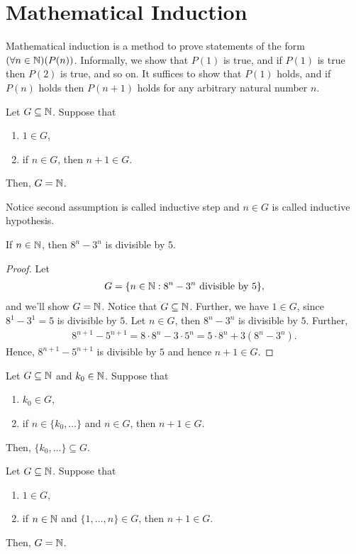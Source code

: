 \documentclass[a4paper,english,12pt]{article}
\begin{document}
\section{Mathematical Induction}
Mathematical induction is a method to prove statements of the form $(\forall n \in \mathbb{N})(P(n))$. Informally, we show that $P(1)$ is true, and if $P(1)$ is true then $P(2)$ is true, and so on. It suffices to show that $P(1)$ holds, and if $P(n)$ holds then $P(n+1)$ holds for any arbitrary natural number $n$.
\begin{thm} Let $G \subseteq \mathbb{N}$. Suppose that
\begin{enumerate}
	\item $1 \in G$,
	\item if $n \in G$, then $n+1 \in G$.
\end{enumerate}
Then, $G = \mathbb{N}$.
\end{thm}
\begin{rem} Notice second assumption is called inductive step and $n \in G$ is called inductive hypothesis.
\end{rem}
\begin{exmp} If $n \in \mathbb{N}$, then $8^n - 3^n$ is divisible by $5$.
\end{exmp}
\begin{proof} Let 
\begin{align*}
G = \{ n \in \mathbb{N} : 8^n - 3^n \text{ divisible by } 5\},
\end{align*}
and we'll show $G = \mathbb{N}$. Notice that $G \subseteq \mathbb{N}$. Further, we have $1 \in G$, since $8^1 - 3^1 = 5$ is divisible by $5$. Let $n \in G$, then $8^n - 3^n$ is divisible by $5$. Further, 
\begin{align*}
8^{n+1}-5^{n+1}= 8\cdot 8^n - 3 \cdot 5^n = 5 \cdot 8^n + 3(8^n-3^n).
\end{align*}
Hence, $8^{n+1}- 5^{n+1}$ is divisible by $5$ and hence $n+1 \in G$.
\end{proof}
\begin{thm} Let $G \subseteq \mathbb{N}$ and $k_0 \in \mathbb{N}$. Suppose that
\begin{enumerate}
	\item $k_0 \in G$,
	\item if $n \in \{k_0, \ldots\}$ and $n \in G$, then $n+1 \in G$.
\end{enumerate}
Then, $\{k_0,\ldots\} \subseteq G$.
\end{thm}
\begin{thm} Let $G \subseteq \mathbb{N}$. Suppose that
\begin{enumerate}
	\item $1 \in G$,
	\item if $n \in \mathbb{N}$ and $\{1, \ldots, n\} \in G$, then $n+1 \in G$.
\end{enumerate}
Then, $G = \mathbb{N}$.
\end{thm}
\end{document}
